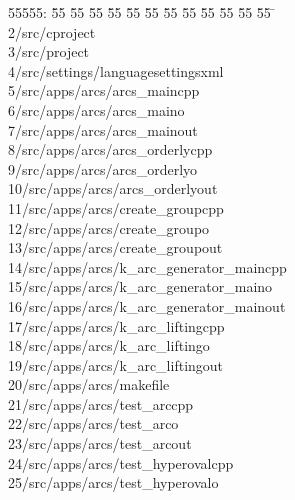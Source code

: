 %
%
\begin{tabbing}
55555: \= 55 \= 55 \= 55 \= 55 \= 55 \= 55 \= 55 \= 55 \= 55 \= 55 \= 55 \= 55 \= \>\\[0pt]
2\>/src/cproject\\[0pt]
3\>/src/project\\[0pt]
4\>/src/settings/languagesettingsxml\\[0pt]
5\>/src/apps/arcs/arcs\_maincpp\\[0pt]
6\>/src/apps/arcs/arcs\_maino\\[0pt]
7\>/src/apps/arcs/arcs\_mainout\\[0pt]
8\>/src/apps/arcs/arcs\_orderlycpp\\[0pt]
9\>/src/apps/arcs/arcs\_orderlyo\\[0pt]
10\>/src/apps/arcs/arcs\_orderlyout\\[0pt]
11\>/src/apps/arcs/create\_groupcpp\\[0pt]
12\>/src/apps/arcs/create\_groupo\\[0pt]
13\>/src/apps/arcs/create\_groupout\\[0pt]
14\>/src/apps/arcs/k\_arc\_generator\_maincpp\\[0pt]
15\>/src/apps/arcs/k\_arc\_generator\_maino\\[0pt]
16\>/src/apps/arcs/k\_arc\_generator\_mainout\\[0pt]
17\>/src/apps/arcs/k\_arc\_liftingcpp\\[0pt]
18\>/src/apps/arcs/k\_arc\_liftingo\\[0pt]
19\>/src/apps/arcs/k\_arc\_liftingout\\[0pt]
20\>/src/apps/arcs/makefile\\[0pt]
21\>/src/apps/arcs/test\_arccpp\\[0pt]
22\>/src/apps/arcs/test\_arco\\[0pt]
23\>/src/apps/arcs/test\_arcout\\[0pt]
24\>/src/apps/arcs/test\_hyperovalcpp\\[0pt]
25\>/src/apps/arcs/test\_hyperovalo\\[0pt]

\end{tabbing}
